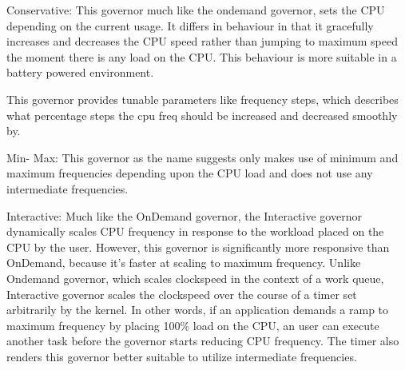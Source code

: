 Conservative:
This governor much like the ondemand governor, sets the CPU depending on the current usage.  It differs in behaviour in that it gracefully increases and decreases the CPU speed rather than jumping to maximum speed the moment there is any load on the CPU. This behaviour is more suitable in a battery powered environment.

This governor provides tunable parameters like frequency steps, which describes what percentage steps the cpu freq should be increased and decreased smoothly by.

Min- Max:
This governor as the name suggests only makes use of minimum and maximum frequencies depending upon the CPU load and does not use any intermediate frequencies.

Interactive:
Much like the OnDemand governor, the Interactive governor dynamically scales CPU frequency in response to the workload placed on the CPU by the user. However, this governor is significantly more responsive than OnDemand, because it's faster at scaling to maximum frequency.
Unlike Ondemand governor, which scales clockspeed in the context of a work queue, Interactive governor scales the clockspeed over the course of a timer set arbitrarily by the kernel. In other words, if an application demands a ramp to maximum frequency by placing 100\% load on the CPU, an user can execute another task before the governor starts reducing CPU frequency. The timer also renders this governor better suitable to utilize intermediate frequencies.


